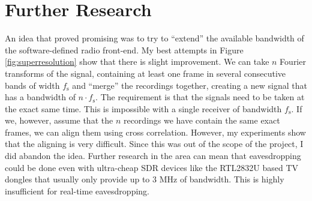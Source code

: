 \documentclass[a4paper,12pt,twoside,openright]{report}
\begin{document}
\section{Further Research}

An idea that proved promising was to try to ``extend'' the available bandwidth of the software-defined radio front-end. My best attempts in Figure \ref{fig:superresolution} show that there is slight improvement. We can take $n$ Fourier transforms of the signal, containing at least one frame in several consecutive bands of width $f_\text{s}$ and ``merge'' the recordings together, creating a new signal that has a bandwidth of $n \cdot f_\text{s}$. The requirement is that the signals need to be taken at the exact same time. This is impossible with a single receiver of bandwidth $f_\text{s}$. If we, however, assume that the $n$ recordings we have contain the same exact frames, we can align them using cross correlation. However, my experiments show that the aligning is very difficult. Since this was out of the scope of the project, I did abandon the idea. Further research in the area can mean that eavesdropping could be done even with ultra-cheap SDR devices like the RTL2832U based TV dongles that usually only provide up to $3$ MHz of bandwidth. This is highly insufficient for real-time eavesdropping.
\end{document}
